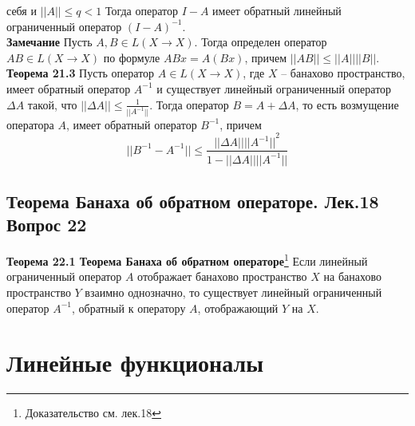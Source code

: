\documentclass{article}
\begin{document}
	себя и $||A||\le q<1$ Тогда оператор $I-A$ имеет обратный линейный
	ограниченный оператор ${(I-A)}^{-1}$.\\
	\textbf{Замечание} Пусть $A,B\in L(X\rightarrow X)$. Тогда определен оператор $AB\in L(X\rightarrow X)$ по формуле $ABx=A(Bx)$, причем $||AB||\le ||A||||B||$.\\
	\textbf{Теорема 21.3} Пусть оператор $A\in L(X\rightarrow X)$, где $X$ – банахово пространство, имеет обратный оператор ${A}^{-1}$ и существует линейный ограниченный оператор $\Delta A$ такой, что $||\Delta A||\le \frac{1}{||{A}^{-1}||}$. Тогда оператор $B=A+\Delta A$, то есть возмущение оператора $A$, имеет обратный оператор ${B}^{-1}$, причем 
	\begin{equation}
	||{B}^{-1}-{A}^{-1}||\le \frac{||\Delta A||{||{A}^{-1}||}^{2}}{1-||\Delta A||||{A}^{-1}||}
	\end{equation}
\subsection{Теорема Банаха об обратном операторе. Лек.18 \textbf{Вопрос 22}}
	\textbf{Теорема 22.1 Теорема Банаха об обратном операторе}\footnote{Доказательство см. лек.18} Если линейный ограниченный оператор $A$ отображает банахово
	пространство $X$ на банахово пространство $Y$ взаимно однозначно, то
	существует линейный ограниченный оператор ${A}^{-1}$, обратный к
	оператору $A$, отображающий $Y$ на $X$.\\
\section{Линейные функционалы}
\end{document}
